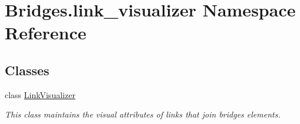 \hypertarget{namespace_bridges_1_1link__visualizer}{}\section{Bridges.\+link\+\_\+visualizer Namespace Reference}
\label{namespace_bridges_1_1link__visualizer}
\subsection*{Classes}
\begin{DoxyCompactItemize}
\item 
class \hyperlink{class_bridges_1_1link__visualizer_1_1_link_visualizer}{Link\+Visualizer}
\begin{DoxyCompactList}\small\item\em This class maintains the visual attributes of links that join bridges elements. \end{DoxyCompactList}\end{DoxyCompactItemize}
